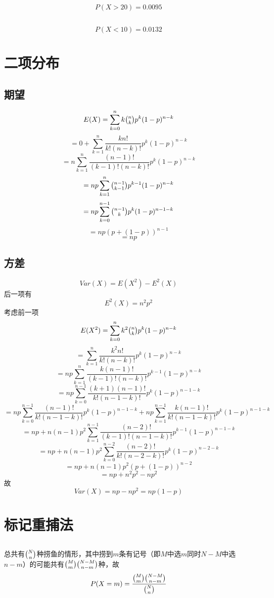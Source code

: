 \documentclass{article}
\begin{document}
\begin{CJK}{UTF8}{gbsn}
\subsection{}
$$ P(X>20)=0.0095 $$
\subsection{}
$$ P(X<10)=0.0132 $$
\section{二项分布}
\subsection{期望}
$$ E(X)=\sum\limits_{k=0}^{n}k\tbinom{n}{k}p^{k}(1-p)^{n-k}$$
$$ =0+\sum\limits_{k=1}^{n}\frac{kn!}{k!(n-k)!}p^{k}(1-p)^{n-k}$$
$$ =n\sum\limits_{k=1}^{n}\frac{(n-1)!}{(k-1)!(n-k)!}p^{k}(1-p)^{n-k}$$
$$ =np\sum\limits_{k=1}^{n}\tbinom{n-1}{k-1}p^{k-1}(1-p)^{n-k} $$
$$ =np\sum\limits_{k=0}^{n-1}\tbinom{n-1}{k}p^{k}(1-p)^{n-1-k}$$
$$ =np(p+(1-p))^{n-1}$$
$$ =np$$
\subsection{方差}
$$ Var(X)=E(X^{2})-E^{2}(X) $$
后一项有
$$ E^{2}(X)=n^{2}p^{2} $$
考虑前一项
$$ E(X^{2})=\sum\limits_{k=0}^{n}k^{2}\tbinom{n}{k}p^{k}(1-p)^{n-k}$$
$$ =\sum\limits_{k=1}^{n}\frac{k^{2}n!}{k!(n-k)!}p^{k}(1-p)^{n-k}$$
$$ =np\sum\limits_{k=1}^{n}\frac{k(n-1)!}{(k-1)!(n-k)!}p^{k-1}(1-p)^{n-k}$$
$$ =np\sum\limits_{k=0}^{n-1}\frac{(k+1)(n-1)!}{k!(n-1-k)!}p^{k}(1-p)^{n-1-k}$$
$$ =np\sum\limits_{k=0}^{n-1}\frac{(n-1)!}{k!(n-1-k)!}p^{k}(1-p)^{n-1-k} + np\sum\limits_{k=1}^{n-1}\frac{k(n-1)!}{k!(n-1-k)!}p^{k}(1-p)^{n-1-k}$$
$$ =np+n(n-1)p^{2}\sum\limits_{k=1}^{n-1}\frac{(n-2)!}{(k-1)!(n-1-k)!}p^{k-1}(1-p)^{n-1-k}$$
$$ =np+n(n-1)p^{2}\sum\limits_{k=0}^{n-2}\frac{(n-2)!}{k!(n-2-k)!}p^{k}(1-p)^{n-2-k}$$
$$ =np+n(n-1)p^{2}(p+(1-p))^{n-2}$$
$$ =np+n^{2}p^{2}-np^{2}$$
故
$$ Var(X)=np-np^{2}=np(1-p)$$
\section{标记重捕法}
\subsection{}
总共有$\tbinom{N}{n}$种捞鱼的情形，其中捞到$m$条有记号（即$M$中选$m$同时$N-M$中选$n-m$）的可能共有$\tbinom{M}{m}\tbinom{N-M}{n-m}$种，故
$$ P(X=m)=\frac{\tbinom{M}{m}\tbinom{N-M}{n-m}}{\tbinom{N}{n}}$$

\end{CJK}
\end{document}
